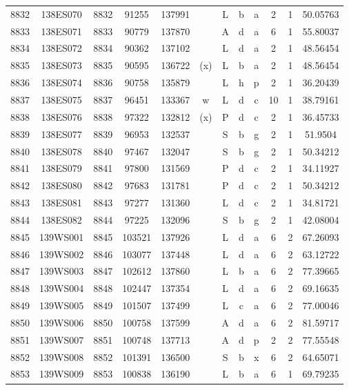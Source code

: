 \begin{tabular}{|*{12}{c|}}
8832 & 138ES070 & 8832 & 91255 & 137991 &  & L & b & a & 2 & 1 & 50.05763 \\ 
8833 & 138ES071 & 8833 & 90779 & 137870 &  & A & d & a & 6 & 1 & 55.80037 \\ 
8834 & 138ES072 & 8834 & 90362 & 137102 &  & L & d & a & 2 & 1 & 48.56454 \\ 
8835 & 138ES073 & 8835 & 90595 & 136722 & (x) & L & b & a & 2 & 1 & 48.56454 \\ 
8836 & 138ES074 & 8836 & 90758 & 135879 &  & L & h & p & 2 & 1 & 36.20439 \\ 
8837 & 138ES075 & 8837 & 96451 & 133367 & w & L & d & c & 10 & 1 & 38.79161 \\ 
8838 & 138ES076 & 8838 & 97322 & 132812 & (x) & P & d & c & 2 & 1 & 36.45733 \\ 
8839 & 138ES077 & 8839 & 96953 & 132537 &  & S & b & g & 2 & 1 & 51.9504 \\ 
8840 & 138ES078 & 8840 & 97467 & 132047 &  & S & b & g & 2 & 1 & 50.34212 \\ 
8841 & 138ES079 & 8841 & 97800 & 131569 &  & P & d & c & 2 & 1 & 34.11927 \\ 
8842 & 138ES080 & 8842 & 97683 & 131781 &  & P & d & c & 2 & 1 & 50.34212 \\ 
8843 & 138ES081 & 8843 & 97277 & 131360 &  & L & d & c & 2 & 1 & 34.81721 \\ 
8844 & 138ES082 & 8844 & 97225 & 132096 &  & S & b & g & 2 & 1 & 42.08004 \\ 
8845 & 139WS001 & 8845 & 103521 & 137926 &  & L & d & a & 6 & 2 & 67.26093 \\ 
8846 & 139WS002 & 8846 & 103077 & 137448 &  & L & d & a & 6 & 2 & 63.12722 \\ 
8847 & 139WS003 & 8847 & 102612 & 137860 &  & L & b & a & 6 & 2 & 77.39665 \\ 
8848 & 139WS004 & 8848 & 102447 & 137354 &  & L & d & a & 6 & 2 & 69.16635 \\ 
8849 & 139WS005 & 8849 & 101507 & 137499 &  & L & c & a & 6 & 2 & 77.00046 \\ 
8850 & 139WS006 & 8850 & 100758 & 137599 &  & A & d & a & 6 & 2 & 81.59717 \\ 
8851 & 139WS007 & 8851 & 100748 & 137713 &  & A & d & p & 2 & 2 & 77.55548 \\ 
8852 & 139WS008 & 8852 & 101391 & 136500 &  & S & b & x & 6 & 2 & 64.65071 \\ 
8853 & 139WS009 & 8853 & 100838 & 136190 &  & L & b & a & 6 & 1 & 69.79235 \\ 

\end{tabular}
